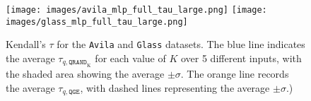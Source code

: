 \begin{figure}[htbp]
    \centering
    \texttt{[image: images/avila\_mlp\_full\_tau\_large.png]}
    \texttt{[image: images/glass\_mlp\_full\_tau\_large.png]}
    \caption{Kendall's $\tau$ for the \texttt{Avila} and \texttt{Glass} datasets. The blue line indicates the average $\tau_{q,\texttt{QRAND}_{\text{K}}}$ for each value of $K$ over 5 different inputs, with the shaded area showing the average 
 $\pm\sigma$. The orange line records the average $\tau_{q,\texttt{QGE}}$, with dashed lines representing the average $\pm\sigma$.)}
    \label{fig:exhaustive_correct_pairs}
\end{figure}






